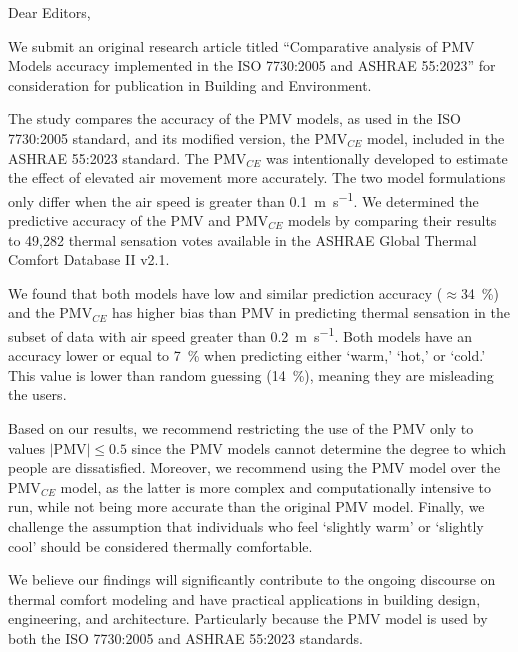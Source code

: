 \documentclass[11pt,a4paper,roman]{moderncv}        %
\begin{document}
\date{\today}
\opening{Dear Editors,}

\makelettertitle

We submit an original research article titled ``Comparative analysis of PMV Models accuracy implemented in the ISO 7730:2005 and ASHRAE 55:2023'' for consideration for publication in Building and Environment.

The study compares the accuracy of the PMV models, as used in the ISO 7730:2005 standard, and its modified version, the PMV$_{CE}$ model, included in the ASHRAE 55:2023 standard.
The PMV$_{CE}$ was intentionally developed to estimate the effect of elevated air movement more accurately.
The two model formulations only differ when the air speed is greater than \qty{0.1}{\m\per\s}.
We determined the predictive accuracy of the PMV and PMV$_{CE}$ models by comparing their results to 49,282 thermal sensation votes available in the ASHRAE Global Thermal Comfort Database II v2.1.

We found that both models have low and similar prediction accuracy ($ \approx$\qty{34}{\percent}) and the PMV$_{CE}$ has higher bias than PMV in predicting thermal sensation in the subset of data with air speed greater than \qty{0.2}{\m\per\s}.
Both models have an accuracy lower or equal to \qty{7}{\percent} when predicting either `warm,' `hot,' or `cold.'
This value is lower than random guessing (\qty{14}{\percent}), meaning they are misleading the users.

Based on our results, we recommend restricting the use of the PMV only to values $\lvert \textrm{PMV} \lvert \leq 0.5$ since the PMV models cannot determine the degree to which people are dissatisfied.
Moreover, we recommend using the PMV model over the PMV$_{CE}$ model, as the latter is more complex and computationally intensive to run, while not being more accurate than the original PMV model.
Finally, we challenge the assumption that individuals who feel `slightly warm' or `slightly cool' should be considered thermally comfortable.

We believe our findings will significantly contribute to the ongoing discourse on thermal comfort modeling and have practical applications in building design, engineering, and architecture.
Particularly because the PMV model is used by both the ISO 7730:2005 and ASHRAE 55:2023 standards.
\end{document}
